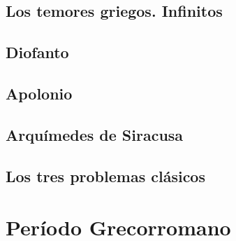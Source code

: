 \documentclass[a4paper,12pt,openany]{article}
\begin{document}
\subsection{Los temores griegos. Infinitos}


\subsection{Diofanto}


\subsection{Apolonio}


\subsection{Arquímedes de Siracusa}


\subsection{Los tres problemas clásicos}


\section{Período Grecorromano}

\end{document}

